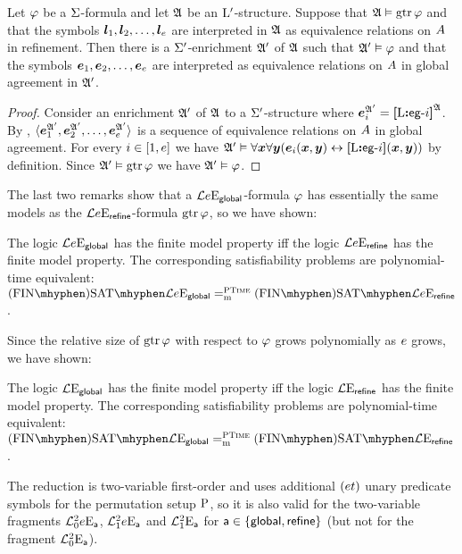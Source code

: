 \begin{remark}\label{rem:global-m-to-e}
Let $\varphi$ be a $\mathrm{\Sigma}$-formula and let $\mathfrak{A}$ be an ${{\mathrm{L}}'}$-structure.
Suppose that $\mathfrak{A} \vDash \operatorname{gtr}\varphi$ and that the symbols
$\bm{l}_{1},\bm{l}_{2},\dots,\bm{l}_{e}$ are interpreted in $\mathfrak{A}$ as equivalence
relations on $A$ in refinement.
Then there is a $\mathrm{\Sigma'}$-enrichment $\mathfrak{A'}$ of $\mathfrak{A}$ such that
$\mathfrak{A'} \vDash \varphi$ and that the symbols $\bm{e}_{1},\bm{e}_{2},\dots,\bm{e}_{e}$ are
interpreted as equivalence relations on $A$ in global agreement in $\mathfrak{A'}$.
\end{remark}
\begin{proof}
Consider an enrichment $\mathfrak{A'}$ of $\mathfrak{A}$ to a $\mathrm{\Sigma'}$-structure
where $\bm{e}_{i}^{\mathfrak{A'}} = {\bm{[}{\mathrm{L}}\mathord{\bm{:}}\mathsf{eg}{\hbox{-}}i\bm{]}}^{\mathfrak{A}}$.
By ,
$\langle \bm{e}_{1}^{\mathfrak{A'}}, \bm{e}_{2}^{\mathfrak{A'}}, \dots, \bm{e}_{e}^{\mathfrak{A'}} \rangle$
is a sequence of equivalence relations on $A$ in global agreement.
For every $i \in [1,e]$ we have 
$\mathfrak{A'} \vDash \forall\bm{x}\forall\bm{y}(\bm{e}_{i}(\bm{x},\bm{y}) \leftrightarrow
{\bm{[}{\mathrm{L}}\mathord{\bm{:}}\mathsf{eg}{\hbox{-}}i\bm{]}}(\bm{x},\bm{y}))$ by definition.
Since $\mathfrak{A'} \vDash \operatorname{gtr}\varphi$ we have $\mathfrak{A'} \vDash \varphi$.
\end{proof}

The last two remarks show that a $\mathcal{L}{e}\mathrm{E}_{\mathsf{global}}$-formula $\varphi$
has essentially the same models as the $\mathcal{L}{e}\mathrm{E}_{\mathsf{refine}}$-formula
$\operatorname{gtr}\varphi$, so we have shown:
\begin{proposition}\label{prop:global-to-refine-n}
The logic $\mathcal{L}{e}\mathrm{E}_{\mathsf{global}}$ has the finite model property iff
the logic $\mathcal{L}{e}\mathrm{E}_{\mathsf{refine}}$ has the finite model property. 
The corresponding satisfiability problems are polynomial-time equivalent:
$\FinASat{\Fo\Eea\sze\agglobal} \redeq\cP \FinASat{\Fo\Eea\sze\agrefine}$.
\end{proposition}

Since the relative size of $\operatorname{gtr}\varphi$ with respect to $\varphi$ grows
polynomially as $e$ grows, we have shown:
\begin{proposition}\label{prop:global-to-refine}
The logic $\mathcal{L}{{}}\mathrm{E}_{\mathsf{global}}$ has the finite model property iff
the logic $\mathcal{L}{{}}\mathrm{E}_{\mathsf{refine}}$ has the finite model property. 
The corresponding satisfiability problems are polynomial-time equivalent:
$\FinASat{\Fo\Eea\nosze\agglobal} \redeq\cP \FinASat{\Fo\Eea\nosze\agrefine}$.
\end{proposition}

The reduction is two-variable first-order and uses additional $(et)$
unary predicate symbols for the permutation setup ${\mathrm{P}}$, so it is also valid
for the two-variable fragments $\mathcal{L}^{2}_{0}{e}\mathrm{E}_{\mathsf{a}}$, $\mathcal{L}^{2}_{1}{e}\mathrm{E}_{\mathsf{a}}$
and $\mathcal{L}^{2}_{1}{{}}\mathrm{E}_{\mathsf{a}}$ for $\mathsf{a} \in \left\{\mathsf{global}, \mathsf{refine}\right\}$ (but not
for the fragment $\mathcal{L}^{2}_{0}{{}}\mathrm{E}_{\mathsf{a}}$).
